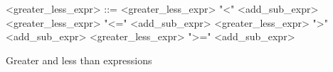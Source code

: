 \begin{Grammar}
 \begin{grammar}

    <greater\_less\_expr> ::= <greater\_less\_expr> "<" <add\_sub\_expr>
    \alt <greater\_less\_expr> "<=" <add\_sub\_expr>								
    \alt <greater\_less\_expr> ">" <add\_sub\_expr>								
    \alt <greater\_less\_expr> ">=" <add\_sub\_expr>
  
 \end{grammar}
 \caption{Greater and less than expressions}\label{gra:greaterorless}
\end{Grammar}
